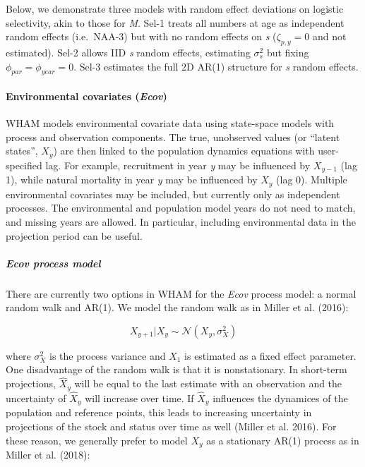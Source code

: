 \documentclass[]{article}
\let\oldparagraph\paragraph
\renewcommand{\paragraph}[1]{\oldparagraph{#1}\mbox{}}
\let\oldsubparagraph\subparagraph
\renewcommand{\subparagraph}[1]{\oldsubparagraph{#1}\mbox{}}
\begin{document}
Below, we demonstrate three models with random effect deviations on
logistic selectivity, akin to those for \emph{M}. Sel-1 treats all
numbers at age as independent random effects (i.e.~NAA-3) but with no
random effects on \emph{s} (\(\zeta_{p,y} = 0\) and not estimated).
Sel-2 allows IID \emph{s} random effects, estimating \(\sigma^2_s\) but
fixing \(\phi_{par} = \phi_{year} = 0\). Sel-3 estimates the full 2D
AR(1) structure for \emph{s} random effects.

\hypertarget{environmental-covariates-ecov}{%
\paragraph{\texorpdfstring{Environmental covariates
(\emph{Ecov})}{Environmental covariates (Ecov)}}\label{environmental-covariates-ecov}}

WHAM models environmental covariate data using state-space models with
process and observation components. The true, unobserved values (or
``latent states'', \(X_y\)) are then linked to the population dynamics
equations with user-specified lag. For example, recruitment in year
\emph{y} may be influenced by \(X_{y-1}\) (lag 1), while natural
mortality in year \emph{y} may be influenced by \(X_y\) (lag 0).
Multiple environmental covariates may be included, but currently only as
independent processes. The environmental and population model years do
not need to match, and missing years are allowed. In particular,
including environmental data in the projection period can be useful.

\hypertarget{ecov-process-model}{%
\subparagraph{\texorpdfstring{\emph{Ecov} process
model}{Ecov process model}}\label{ecov-process-model}}

There are currently two options in WHAM for the \emph{Ecov} process
model: a normal random walk and AR(1). We model the random walk as in
Miller et al. (2016):

\[X_{y+1} | X_y \sim \mathcal{N}\left( X_y, \sigma^2_X\right)\]

where \(\sigma^2_X\) is the process variance and \(X_1\) is estimated as
a fixed effect parameter. One disadvantage of the random walk is that it
is nonstationary. In short-term projections, \(\hat{X}_y\) will be equal
to the last estimate with an observation and the uncertainty of
\(\hat{X}_y\) will increase over time. If \(\hat{X}_y\) influences the
dynamices of the population and reference points, this leads to
increasing uncertainty in projections of the stock and status over time
as well (Miller et al. 2016). For these reason, we generally prefer to
model \(X_y\) as a stationary AR(1) process as in Miller et al. (2018):
\end{document}
